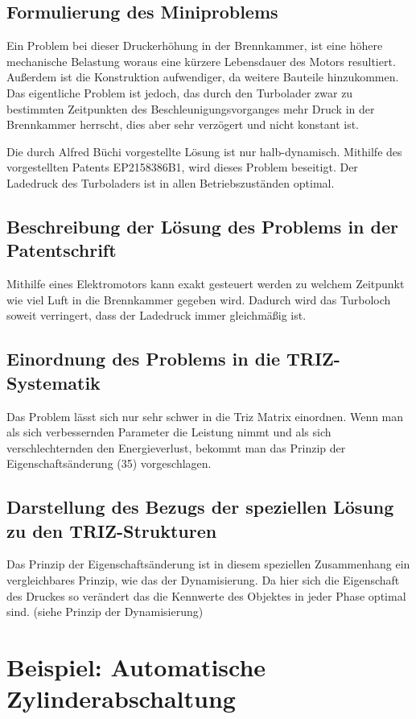 \documentclass[11pt,a4paper]{article}
\begin{document}
\subsection{Formulierung des Miniproblems}
Ein Problem bei dieser Druckerhöhung in der Brennkammer, ist eine höhere
mechanische Belastung woraus eine kürzere Lebensdauer des Motors resultiert.
Außerdem ist die Konstruktion aufwendiger, da weitere Bauteile hinzukommen.
Das eigentliche Problem ist jedoch, das durch den Turbolader zwar zu
bestimmten Zeitpunkten des Beschleunigungsvorganges mehr Druck in der
Brennkammer herrscht, dies aber sehr verzögert und nicht konstant ist.

Die durch Alfred Büchi vorgestellte Lösung ist nur halb-dynamisch. Mithilfe
des vorgestellten Patents EP2158386B1, wird dieses Problem beseitigt. Der
Ladedruck des Turboladers ist in allen Betriebszuständen optimal.

\subsection{Beschreibung der Lösung des Problems in der Patentschrift}

Mithilfe eines Elektromotors kann exakt gesteuert werden zu welchem Zeitpunkt
wie viel Luft in die Brennkammer gegeben wird. Dadurch wird das Turboloch
soweit verringert, dass der Ladedruck immer gleichmäßig ist.

\subsection{Einordnung des Problems in die TRIZ-Systematik}
Das Problem lässt sich nur sehr schwer in die Triz Matrix einordnen. Wenn man
als sich verbessernden Parameter die Leistung nimmt und als sich
verschlechternden den Energieverlust, bekommt man das Prinzip der
Eigenschaftsänderung (35) vorgeschlagen.
\subsection{Darstellung des Bezugs der speziellen Lösung zu den
  TRIZ-Strukturen}

Das Prinzip der Eigenschaftsänderung ist in diesem speziellen Zusammenhang ein
vergleichbares Prinzip, wie das der Dynamisierung. Da hier sich die
Eigenschaft des Druckes so verändert das die Kennwerte des Objektes in jeder
Phase optimal sind. (siehe Prinzip der Dynamisierung)

\section{Beispiel: Automatische Zylinderabschaltung}
\end{document}

